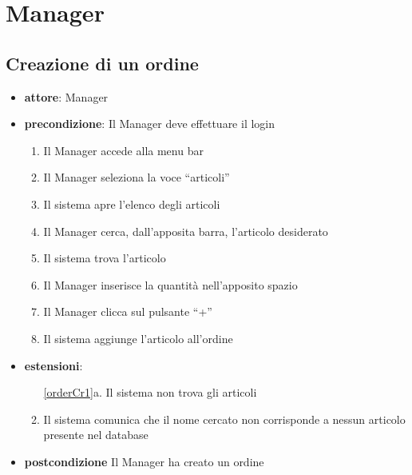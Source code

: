 \chapter{Manager}

\section{Creazione di un ordine}
\begin{itemize}
    \item \textbf{attore}: Manager
    \item \textbf{precondizione}: Il Manager deve effettuare il login

    \begin{enumerate}
        \item Il Manager accede alla menu bar
        \item Il Manager seleziona la voce “articoli”
        \item Il sistema apre l’elenco degli articoli
        \item Il Manager cerca, dall’apposita barra, l’articolo desiderato
        \item Il sistema trova l’articolo
        \label{orderCr1}
        \item Il Manager inserisce la quantità nell’apposito spazio
        \item Il Manager clicca sul pulsante “+”
        \item Il sistema aggiunge l’articolo all’ordine
    \end{enumerate}

    \item \textbf{estensioni}:
    \begin{enumerate}
        \item[\ref{orderCr1}a.] Il sistema non trova gli articoli
        \item Il sistema comunica che il nome cercato non corrisponde a nessun articolo presente nel database
    \end{enumerate}

    \item \textbf{postcondizione} Il Manager ha creato un ordine
\end{itemize}


